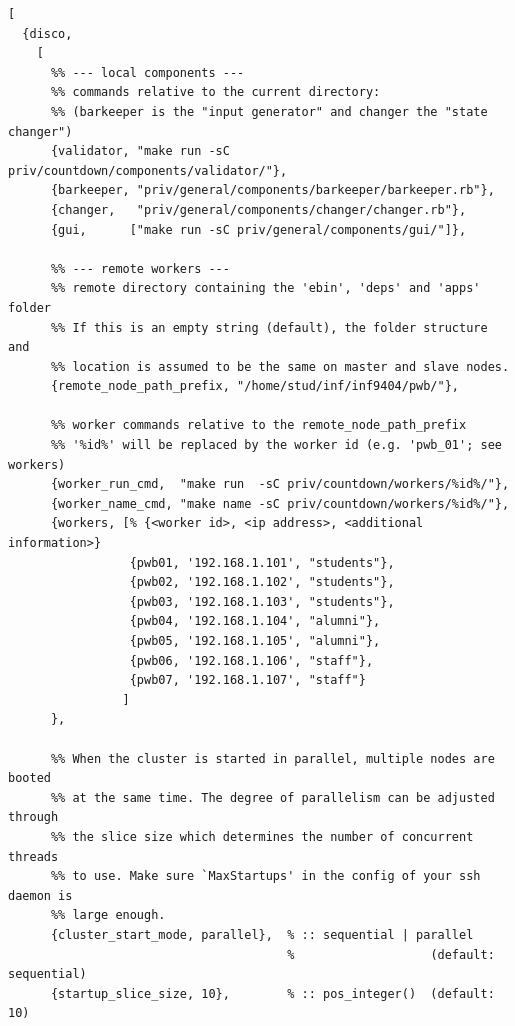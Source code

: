\documentclass[a4paper, 12pt]{article}
\begin{document}
\begin{lstlisting}
[
  {disco,
    [
      %% --- local components ---
      %% commands relative to the current directory:
      %% (barkeeper is the "input generator" and changer the "state changer")
      {validator, "make run -sC priv/countdown/components/validator/"},
      {barkeeper, "priv/general/components/barkeeper/barkeeper.rb"},
      {changer,   "priv/general/components/changer/changer.rb"},
      {gui,      ["make run -sC priv/general/components/gui/"]},

      %% --- remote workers ---
      %% remote directory containing the 'ebin', 'deps' and 'apps' folder
      %% If this is an empty string (default), the folder structure and
      %% location is assumed to be the same on master and slave nodes.
      {remote_node_path_prefix, "/home/stud/inf/inf9404/pwb/"},

      %% worker commands relative to the remote_node_path_prefix
      %% '%id%' will be replaced by the worker id (e.g. 'pwb_01'; see workers)
      {worker_run_cmd,  "make run  -sC priv/countdown/workers/%id%/"},
      {worker_name_cmd, "make name -sC priv/countdown/workers/%id%/"},
      {workers, [% {<worker id>, <ip address>, <additional information>}
                 {pwb01, '192.168.1.101', "students"},
                 {pwb02, '192.168.1.102', "students"},
                 {pwb03, '192.168.1.103', "students"},
                 {pwb04, '192.168.1.104', "alumni"},
                 {pwb05, '192.168.1.105', "alumni"},
                 {pwb06, '192.168.1.106', "staff"},
                 {pwb07, '192.168.1.107', "staff"}
                ]
      },

      %% When the cluster is started in parallel, multiple nodes are booted
      %% at the same time. The degree of parallelism can be adjusted through
      %% the slice size which determines the number of concurrent threads
      %% to use. Make sure `MaxStartups' in the config of your ssh daemon is
      %% large enough.
      {cluster_start_mode, parallel},  % :: sequential | parallel
                                       %                   (default: sequential)
      {startup_slice_size, 10},        % :: pos_integer()  (default: 10)


\end{lstlisting}
\end{document}
